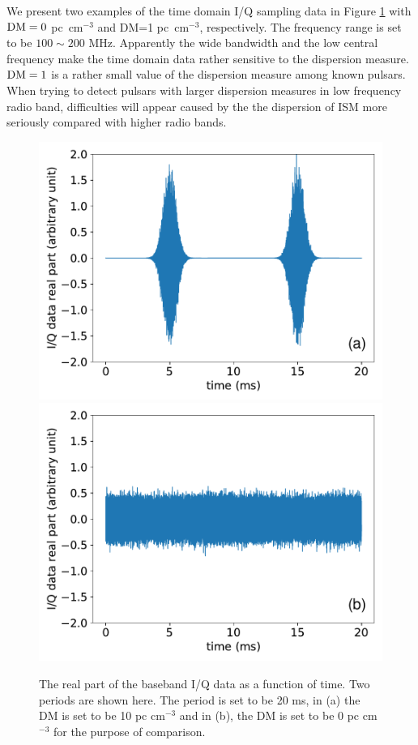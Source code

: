 \documentclass[fleqn,usenatbib]{mnras}
\begin{document}
 We present two examples of the time domain I/Q sampling data in Figure \ref{fig:iq_data} with ${\rm DM}=0$ pc~cm$^{-3}$ and DM=1 pc~cm$^{-3}$, respectively.
 The frequency range is set to be $100\sim 200$ MHz.
 Apparently the wide bandwidth and the low central frequency make the time domain data rather sensitive to the dispersion measure.
 ${\rm DM}=1$ is a rather small value of the dispersion measure among known pulsars.
 When trying to detect pulsars with larger dispersion measures in low frequency radio band, difficulties will appear caused by the the dispersion of ISM more seriously compared with higher radio bands.
 
 
\begin{figure}
    \centering
    \includegraphics[width=0.95\columnwidth]{dm0_iq.pdf}
    \includegraphics[width=0.95\columnwidth]{dm1_iq.pdf}
    \caption{The real part of the baseband I/Q data as a function of time. Two periods are shown here. The period is set to be 20 ms, in (a) the DM is set to be 10 pc cm$^{-3}$ and in (b), the DM is set to be 0 pc cm$^{-3}$ for the purpose of comparison.}
    \label{fig:iq_data}
\end{figure}
\end{document}
